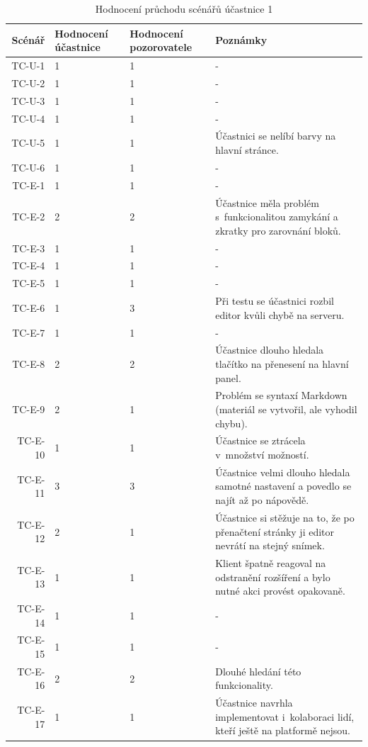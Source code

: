 \begin{longtable}{r|p{2cm}|p{2cm}|p{6cm}}
    \caption{Hodnocení průchodu scénářů účastnice 1}\label{tab:hodnoceniPruchoduUcastnika1}\\
Scénář & Hodnocení účastnice & Hodnocení pozorovatele & Poznámky\\\hline\hline
TC-U-1   & 1 & 1 & - \\\hline
TC-U-2   & 1 & 1 & - \\\hline
TC-U-3   & 1 & 1 & - \\\hline
TC-U-4   & 1 & 1 & -  \\\hline
TC-U-5   & 1 & 1 & Účastnici se nelíbí barvy na hlavní stránce. \\\hline
TC-U-6   & 1 & 1 & - \\\hline
TC-E-1   & 1 & 1 & - \\\hline
TC-E-2   & 2 & 2 & Účastnice měla problém s~funkcionalitou zamykání a zkratky pro zarovnání bloků.  \\\hline
TC-E-3   & 1 & 1 & - \\\hline
TC-E-4   & 1 & 1 & - \\\hline
TC-E-5   & 1 & 1 & - \\\hline
TC-E-6   & 1 & 3 & Při testu se účastnici rozbil editor kvůli chybě na serveru.  \\\hline
TC-E-7   & 1 & 1 & - \\\hline
TC-E-8   & 2 & 2 & Účastnice dlouho hledala tlačítko na přenesení na hlavní panel. \\\hline
TC-E-9   & 2 & 1 & Problém se syntaxí Markdown (materiál se vytvořil, ale vyhodil chybu). \\\hline
TC-E-10  & 1 & 1 & Účastnice se ztrácela v~množství možností. \\\hline
TC-E-11  & 3 & 3 & Účastnice velmi dlouho hledala samotné nastavení a povedlo se najít až po nápovědě. \\\hline
TC-E-12  & 2 & 1 & Účastnice si stěžuje na to, že po přenačtení stránky ji editor nevrátí na stejný snímek. \\\hline
TC-E-13  & 1 & 1 & Klient špatně reagoval na odstranění rozšíření a bylo nutné akci provést opakovaně. \\\hline
TC-E-14  & 1 & 1 & - \\\hline
TC-E-15  & 1 & 1 & - \\\hline
TC-E-16  & 2 & 2 & Dlouhé hledání této funkcionality. \\\hline
TC-E-17  & 1 & 1 & Účastnice navrhla implementovat i~kolaboraci lidí, kteří ještě na platformě nejsou. \\\hline

\end{longtable}
